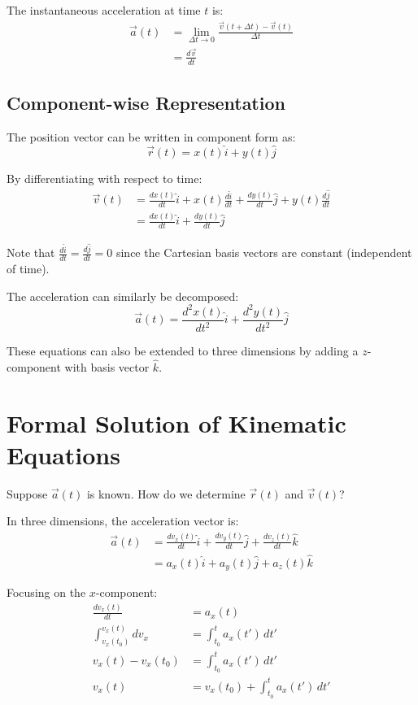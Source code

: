 \documentclass{article}
\begin{document}
The instantaneous acceleration at time $t$ is:
\begin{align*}
\vec{a}(t) &= \lim_{\Delta t\to0}\frac{\vec{v}(t + \Delta t) - \vec{v}(t)}{\Delta t} \\
&= \frac{d\vec{v}}{dt}
\end{align*}

\subsection*{Component-wise Representation}

The position vector can be written in component form as:
\[
\vec{r}(t) = x(t)\hat{i} + y(t)\hat{j}
\]

By differentiating with respect to time:
\begin{align*}
    \vec{v}(t) &= \frac{dx(t)}{dt}\hat{i} + x(t)\frac{d\hat{i}}{dt} + \frac{dy(t)}{dt}\hat{j} + y(t)\frac{d\hat{j}}{dt} \\
    &= \frac{dx(t)}{dt}\hat{i} + \frac{dy(t)}{dt}\hat{j}
\end{align*}

\noindent
Note that $\frac{d\hat{i}}{dt} = \frac{d\hat{j}}{dt} = 0$ since the Cartesian basis vectors are constant (independent of time).

\noindent
The acceleration can similarly be decomposed:
\[
\vec{a}(t) = \frac{d^2x(t)}{dt^2}\hat{i} + \frac{d^2y(t)}{dt^2}\hat{j}
\]

\noindent
These equations can also be extended to three dimensions by adding a $z$-component with basis vector $\hat{k}$.

\newpage

\section*{Formal Solution of Kinematic Equations}

Suppose $\vec{a}(t)$ is known. How do we determine $\vec{r}(t)$ and $\vec{v}(t)$?

\noindent
In three dimensions, the acceleration vector is:
\begin{align*}
    \vec{a}(t) &= \frac{dv_x(t)}{dt}\hat{i} + \frac{dv_y(t)}{dt}\hat{j} + \frac{dv_z(t)}{dt}\hat{k} \\ 
    &= a_x(t)\hat{i} + a_y(t)\hat{j} + a_z(t)\hat{k}
\end{align*}

\noindent
Focusing on the $x$-component:
\begin{align*}
    \frac{dv_x(t)}{dt} &= a_x(t) \\
    \int_{v_x(t_0)}^{v_x(t)} dv_x &= \int_{t_0}^{t} a_x(t')\,dt' \\
    v_x(t) - v_x(t_0) &= \int_{t_0}^{t} a_x(t')\,dt' \\
    v_x(t) &= v_x(t_0) + \int_{t_0}^{t} a_x(t')\,dt'
\end{align*}
\end{document}
